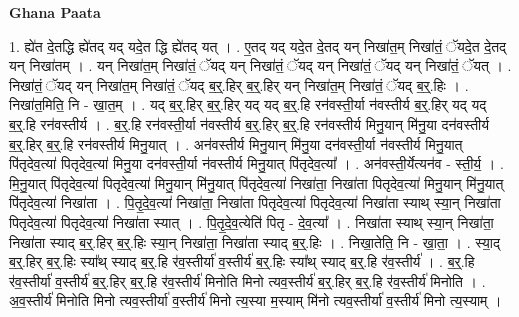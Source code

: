 \documentclass[17pt]{extarticle}
\begin{document}
\textbf{Ghana Paata } \newline

1. ह्ये॑त दे॒तद्धि ह्ये॑तद् यद् यदे॒त द्धि ह्ये॑तद् यत् । . ए॒तद् यद् यदे॒त दे॒तद् यन् निखा॑त॒म् निखा॑तं॒ ॅयदे॒त दे॒तद् यन् निखा॑तम् । . यन् निखा॑त॒म् निखा॑तं॒ ॅयद् यन् निखा॑तं॒ ॅयद् यन् निखा॑तं॒ ॅयद् यन् निखा॑तं॒ ॅयत् । . निखा॑तं॒ ॅयद् यन् निखा॑त॒म् निखा॑तं॒ ॅयद् ब॒र्॒.हिर् ब॒र्॒.हिर् यन् निखा॑त॒म् निखा॑तं॒ ॅयद् ब॒र्॒.हिः । . निखा॑त॒मिति॒ नि - खा॒त॒म् । . यद् ब॒र्॒.हिर् ब॒र्॒.हिर् यद् यद् ब॒र्॒.हि रन॑वस्ती॒र्या न॑वस्तीर्य ब॒र्॒.हिर् यद् यद् ब॒र्॒.हि रन॑वस्तीर्य । . ब॒र्॒.हि रन॑वस्ती॒र्या न॑वस्तीर्य ब॒र्॒.हिर् ब॒र्॒.हि रन॑वस्तीर्य मिनु॒यान् मि॑नु॒या दन॑वस्तीर्य ब॒र्॒.हिर् ब॒र्॒.हि रन॑वस्तीर्य मिनु॒यात् । . अन॑वस्तीर्य मिनु॒यान् मि॑नु॒या दन॑वस्ती॒र्या न॑वस्तीर्य मिनु॒यात् पि॑तृदेव॒त्या॑ पितृदेव॒त्या॑ मिनु॒या दन॑वस्ती॒र्या न॑वस्तीर्य मिनु॒यात् पि॑तृदेव॒त्या᳚ । . अन॑वस्ती॒र्येत्यन॑व - स्ती॒र्य॒ । . मि॒नु॒यात् पि॑तृदेव॒त्या॑ पितृदेव॒त्या॑ मिनु॒यान् मि॑नु॒यात् पि॑तृदेव॒त्या॑ निखा॑ता॒ निखा॑ता पितृदेव॒त्या॑ मिनु॒यान् मि॑नु॒यात् पि॑तृदेव॒त्या॑ निखा॑ता । . पि॒तृ॒दे॒व॒त्या॑ निखा॑ता॒ निखा॑ता पितृदेव॒त्या॑ पितृदेव॒त्या॑ निखा॑ता स्याथ् स्या॒न् निखा॑ता पितृदेव॒त्या॑ पितृदेव॒त्या॑ निखा॑ता स्यात् । . पि॒तृ॒दे॒व॒त्येति॑ पितृ - दे॒व॒त्या᳚ । . निखा॑ता स्याथ् स्या॒न् निखा॑ता॒ निखा॑ता स्याद् ब॒र्॒.हिर् ब॒र्॒.हिः स्या॒न् निखा॑ता॒ निखा॑ता स्याद् ब॒र्॒.हिः । . निखा॒तेति॒ नि - खा॒ता॒ । . स्या॒द् ब॒र्॒.हिर् ब॒र्॒.हिः स्या᳚थ् स्याद् ब॒र्॒.हि र॑व॒स्तीर्या॑ व॒स्तीर्य॑ ब॒र्॒.हिः स्या᳚थ् स्याद् ब॒र्॒.हि र॑व॒स्तीर्य॑ । . ब॒र्॒.हि र॑व॒स्तीर्या॑ व॒स्तीर्य॑ ब॒र्॒.हिर् ब॒र्॒.हि र॑व॒स्तीर्य॑ मिनोति मिनो त्यव॒स्तीर्य॑ ब॒र्॒.हिर् ब॒र्॒.हि र॑व॒स्तीर्य॑ मिनोति । . अ॒व॒स्तीर्य॑ मिनोति मिनो त्यव॒स्तीर्या॑ व॒स्तीर्य॑ मिनो त्य॒स्या म॒स्याम् मि॑नो त्यव॒स्तीर्या॑ व॒स्तीर्य॑ मिनो त्य॒स्याम् । \newline
\end{document}
